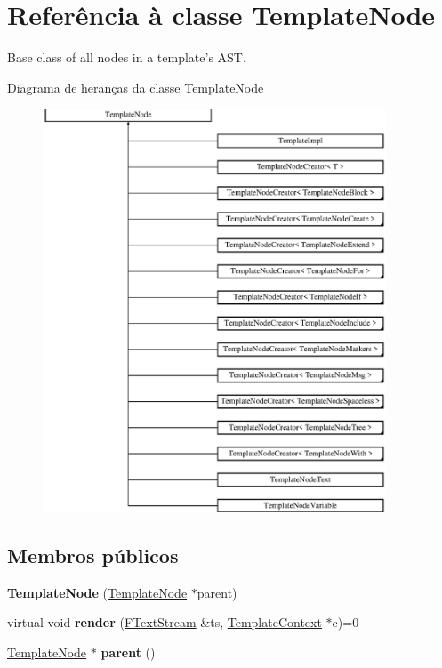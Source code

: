 \hypertarget{class_template_node}{\section{Referência à classe Template\-Node}
\label{class_template_node}
}


Base class of all nodes in a template's A\-S\-T.  


Diagrama de heranças da classe Template\-Node\begin{figure}[H]
\begin{center}
\leavevmode
\includegraphics[height=12.000000cm]{class_template_node}
\end{center}
\end{figure}
\subsection*{Membros públicos}
\begin{DoxyCompactItemize}
\item 
\hypertarget{class_template_node_a48f6be59d5c85b9537c0f94f0ab3cda9}{{\bfseries Template\-Node} (\hyperlink{class_template_node}{Template\-Node} $\ast$parent)}\label{class_template_node_a48f6be59d5c85b9537c0f94f0ab3cda9}

\item 
\hypertarget{class_template_node_a65dc31adfae28e2e980b1260bc543d87}{virtual void {\bfseries render} (\hyperlink{class_f_text_stream}{F\-Text\-Stream} \&ts, \hyperlink{class_template_context}{Template\-Context} $\ast$c)=0}\label{class_template_node_a65dc31adfae28e2e980b1260bc543d87}

\item 
\hypertarget{class_template_node_a25f09ef048e5d982b537722267562aea}{\hyperlink{class_template_node}{Template\-Node} $\ast$ {\bfseries parent} ()}\label{class_template_node_a25f09ef048e5d982b537722267562aea}

\end{DoxyCompactItemize}


